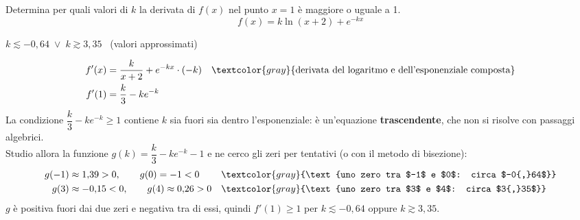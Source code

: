\begin{question}[ID=4.2, subtitle={Derivata di $k\ln(x+2)+e^{-kx}$ in $x=1$ maggiore o uguale a 1}, tags={derivate, parametrico}, difficulty=media]
Determina per quali valori di \( k \) la derivata di $f(x)$ nel punto \( x = 1 \) è maggiore o uguale a 1.
\[
f(x) = k\ln(x+2) + e^{-kx}
\]
\begin{solution}
$k\lesssim-0{,}64 \;\vee\; k\gtrsim3{,}35$ \ (valori approssimati)
\end{solution}
\begin{explanation}
\[\begin{aligned}
f'(x) &= \dfrac{k}{x+2}+e^{-kx}\cdot(-k) && \textcolor{gray}{\text{derivata del logaritmo e dell'esponenziale composta}}\\
f'(1) &= \dfrac k3-ke^{-k}
\end{aligned}\]
La condizione $\dfrac k3-ke^{-k}\geq1$ contiene $k$ sia fuori sia dentro l'esponenziale: è un'equazione \textbf{trascendente}, che non si risolve con passaggi algebrici. \\
Studio allora la funzione $g(k)=\dfrac k3-ke^{-k}-1$ e ne cerco gli zeri per tentativi (o con il metodo di bisezione):
\[\begin{aligned}
g(-1) &\approx 1{,}39>0, \qquad g(0)=-1<0 && \textcolor{gray}{\text{uno zero tra $-1$ e $0$: circa $-0{,}64$}}\\
g(3) &\approx -0{,}15<0, \qquad g(4)\approx 0{,}26>0 && \textcolor{gray}{\text{uno zero tra $3$ e $4$: circa $3{,}35$}}
\end{aligned}\]
$g$ è positiva fuori dai due zeri e negativa tra di essi, quindi $f'(1)\geq1$ per $k\lesssim-0{,}64$ oppure $k\gtrsim3{,}35$.
\end{explanation}
\end{question}


